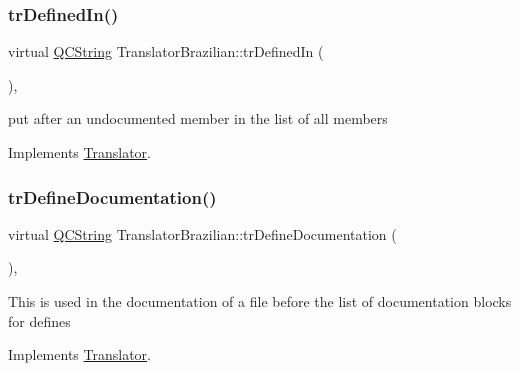 \mbox{\label{class_translator_brazilian_a18db7766c026b3598cba4934be1fcd04}} 
\subsubsection{\texorpdfstring{trDefinedIn()}{trDefinedIn()}}
{\footnotesize\ttfamily virtual \mbox{\hyperlink{class_q_c_string}{Q\+C\+String}} Translator\+Brazilian\+::tr\+Defined\+In (\begin{DoxyParamCaption}{ }\end{DoxyParamCaption})\hspace{0.3cm}{\ttfamily [inline]}, {\ttfamily [virtual]}}

put after an undocumented member in the list of all members 

Implements \mbox{\hyperlink{class_translator}{Translator}}.

\mbox{\label{class_translator_brazilian_a25bfd4e60bce910f19f5b71161e24017}} 
\subsubsection{\texorpdfstring{trDefineDocumentation()}{trDefineDocumentation()}}
{\footnotesize\ttfamily virtual \mbox{\hyperlink{class_q_c_string}{Q\+C\+String}} Translator\+Brazilian\+::tr\+Define\+Documentation (\begin{DoxyParamCaption}{ }\end{DoxyParamCaption})\hspace{0.3cm}{\ttfamily [inline]}, {\ttfamily [virtual]}}

This is used in the documentation of a file before the list of documentation blocks for defines 

Implements \mbox{\hyperlink{class_translator}{Translator}}.

\mbox{\label{class_translator_brazilian_ad318718c90400f59196e7b46e8ceaa7c}} 
